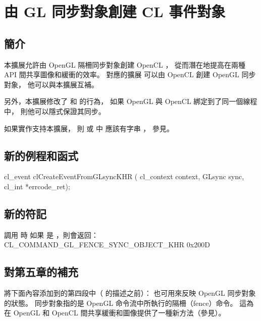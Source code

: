 \section[sec:clEvtObjFromGlSync]{由 GL 同步對象創建 CL 事件對象}

\subsection{簡介}

本擴展允許由 OpenGL 隔柵同步對象創建 OpenCL ，
從而潛在地提高在兩種 API 間共享圖像和緩衝的效率。
對應的擴展  可以由 OpenCL 創建 OpenGL 同步對象，
他可以與本擴展互補。

另外，本擴展修改了  和  的行為，
如果 OpenGL  與 OpenCL  綁定到了同一個線程中，
則他可以隱式保證其同步。

如果實作支持本擴展，
則  或  中
應該有字串 ，
參見。

\subsection{新的例程和函式}


\startCLFUNC
cl_event clCreateEventFromGLsyncKHR (
			cl_context context,
			GLsync sync,
			cl_int *errcode_ret);
\stopCLFUNC

\subsection{新的符記}

調用  時
如果  是 ，則會返回：
\startclc
CL_COMMAND_GL_FENCE_SYNC_OBJECT_KHR	0x200D
\stopclc

\subsection{對第五章的補充}

將下面內容添加到的第四段中（ 的描述之前）：
\startreplacepar
{}也可用來反映 OpenGL 同步對象的狀態。
同步對象指的是 OpenGL 命令流中所執行的隔柵（fence）命令。
這為在 OpenGL 和 OpenCL 間共享緩衝和圖像提供了一種新方法（參見）。
\stopreplacepar


